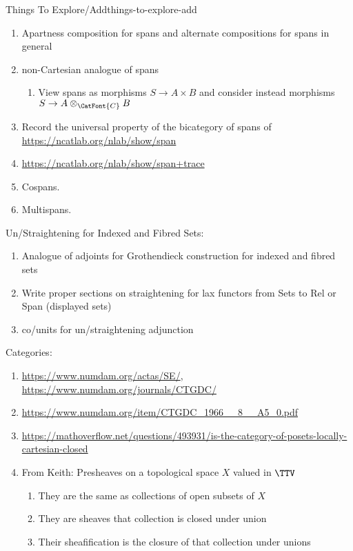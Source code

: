 \begin{remark}{Things To Explore/Add}{things-to-explore-add}
\begin{enumerate}
        \item Apartness composition for spans and alternate compositions for spans in general
        \item non-Cartesian analogue of spans
            \begin{enumerate}
                \item View spans as morphisms $S\to A\times B$ and consider instead morphisms $S\to A\otimes_{\CatFont{C}}B$
            \end{enumerate}
        \item Record the universal property of the bicategory of spans of \url{https://ncatlab.org/nlab/show/span}
        \item \url{https://ncatlab.org/nlab/show/span+trace}
        \item Cospans.
        \item Multispans.
    \end{enumerate}
    Un/Straightening for Indexed and Fibred Sets:
    \begin{enumerate}
        \item Analogue of adjoints for Grothendieck construction for indexed and fibred sets
        \item Write proper sections on straightening for lax functors from Sets to Rel or Span (displayed sets)
        \item co/units for un/straightening adjunction
    \end{enumerate}
    Categories:
    \begin{enumerate}
        \item \url{https://www.numdam.org/actas/SE/}, \url{https://www.numdam.org/journals/CTGDC/}
        \item \url{https://www.numdam.org/item/CTGDC_1966__8__A5_0.pdf}
        \item \url{https://mathoverflow.net/questions/493931/is-the-category-of-posets-locally-cartesian-closed}
        \item From Keith: Presheaves on a topological space $X$ valued in $\TTV$
            \begin{enumerate}
                \item They are the same as collections of open subsets of $X$
                \item They are sheaves \textiff that collection is closed under union
                \item Their sheafification is the closure of that collection under unions
            \end{enumerate}

\end{enumerate}
\end{remark}
